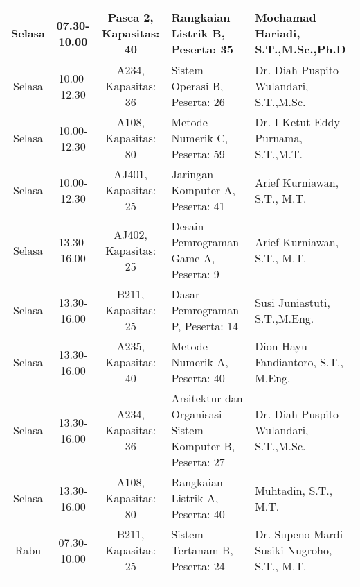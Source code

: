 \begin{longtable}[c]{|c|c|c|>{\centering\arraybackslash}m{3cm}|>{\centering\arraybackslash}m{3cm}|}
  Selasa & 07.30-10.00 & Pasca 2, Kapasitas: 40 & Rangkaian Listrik B, \linebreak Peserta: 35                         & Mochamad Hariadi, S.T.,M.Sc.,Ph.D             \\ \hline
  Selasa & 10.00-12.30 & A234, Kapasitas: 36    & Sistem Operasi B, \linebreak Peserta: 26                            & Dr. Diah Puspito Wulandari, S.T.,M.Sc.        \\ \hline
  Selasa & 10.00-12.30 & A108, Kapasitas: 80    & Metode Numerik C, \linebreak Peserta: 59                            & Dr. I Ketut Eddy Purnama, S.T.,M.T.           \\ \hline
  Selasa & 10.00-12.30 & AJ401, Kapasitas: 25   & Jaringan Komputer A, \linebreak Peserta: 41                         & Arief Kurniawan, S.T., M.T.                   \\ \hline
  Selasa & 13.30-16.00 & AJ402, Kapasitas: 25   & Desain Pemrograman Game A, \linebreak Peserta: 9                    & Arief Kurniawan, S.T., M.T.                   \\ \hline
  Selasa & 13.30-16.00 & B211, Kapasitas: 25    & Dasar Pemrograman P, \linebreak Peserta: 14                         & Susi Juniastuti, S.T.,M.Eng.                  \\ \hline
  Selasa & 13.30-16.00 & A235, Kapasitas: 40    & Metode Numerik A, \linebreak Peserta: 40                            & Dion Hayu Fandiantoro, S.T., M.Eng.           \\ \hline
  Selasa & 13.30-16.00 & A234, Kapasitas: 36    & Arsitektur dan Organisasi Sistem Komputer B, \linebreak Peserta: 27 & Dr. Diah Puspito Wulandari, S.T.,M.Sc.        \\ \hline
  Selasa & 13.30-16.00 & A108, Kapasitas: 80    & Rangkaian Listrik A, \linebreak Peserta: 40                         & Muhtadin, S.T., M.T.                          \\ \hline
  \rowcolor[HTML]{DAE8FC} 
  Rabu   & 07.30-10.00 & B211, Kapasitas: 25    & Sistem Tertanam B, \linebreak Peserta: 24                           & Dr. Supeno Mardi Susiki Nugroho, S.T., M.T.   \\ \hline
  \rowcolor[HTML]{DAE8FC} 

\end{longtable}
